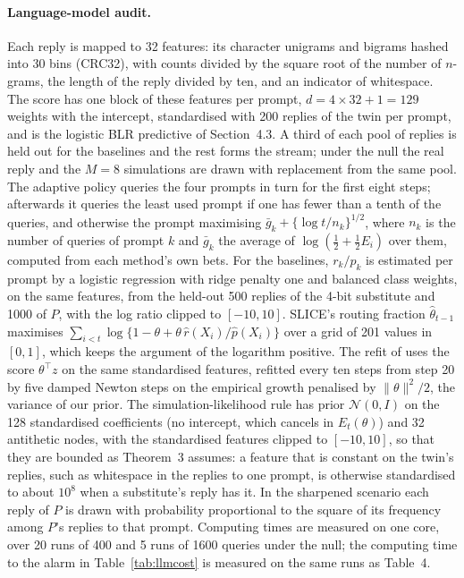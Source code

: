 \documentclass[11pt]{article}
\theoremstyle{remark}
\begin{document}
\paragraph{Language-model audit.} Each reply is mapped to 32 features: its
character unigrams and bigrams hashed into 30 bins (CRC32), with counts divided
by the square root of the number of $n$-grams, the length of the reply divided
by ten, and an indicator of whitespace. The score has one block of these
features per prompt, $d = 4 \times 32 + 1 = 129$ weights with the intercept,
standardised with 200 replies of the twin per prompt, and is the logistic
BLR predictive of Section~4.3. A third of each pool of replies is
held out for the baselines and the rest forms the stream; under the null the
real reply and the $M = 8$ simulations are drawn with replacement from the same
pool. The adaptive policy queries the four prompts in turn for the first eight
steps; afterwards it queries the least used prompt if one has fewer than a
tenth of the queries, and otherwise the prompt maximising
$\bar g_k + \{\log t / n_k\}^{1/2}$, where $n_k$ is the number of queries of prompt
$k$ and $\bar g_k$ the average of $\log(\frac12 + \frac12 E_i)$ over them, computed
from each method's own bets. For the baselines, $r_k/p_k$ is estimated per
prompt by a logistic regression with ridge penalty one and balanced class
weights, on the same features, from the held-out 500 replies of the 4-bit
substitute and 1000 of $P$, with the log ratio clipped to $[-10, 10]$. SLICE's
routing fraction $\hat\theta_{t-1}$ maximises
$\sum_{i<t}\log\{1 - \theta + \theta\,\hat r(X_i)/\hat p(X_i)\}$ over a grid of 201
values in $[0, 1]$, which keeps the argument of the logarithm positive.
The refit of \citet{forre2026anytime} uses the score $\theta^\top z$ on the
same standardised features, refitted every ten steps from step 20 by five
damped Newton steps on the empirical growth penalised by $\|\theta\|^2/2$, the
variance of our prior. The simulation-likelihood rule has prior
$\mathcal N(0, I)$ on the 128 standardised coefficients (no intercept, which
cancels in $E_t(\theta)$) and 32 antithetic nodes, with the standardised
features clipped to $[-10, 10]$, so that they are bounded as
Theorem~3 assumes: a feature that is constant on the twin's
replies, such as whitespace in the replies to one prompt, is otherwise
standardised to about $10^8$ when a substitute's reply has it. In the
sharpened scenario each reply of $P$ is drawn with probability proportional
to the square of its frequency among $P$'s replies to that prompt. Computing
times are measured on one core, over 20 runs of 400 and 5 runs of 1600
queries under the null; the computing time to the alarm in
Table~\ref{tab:llmcost} is measured on the same runs as Table~4.
\end{document}

